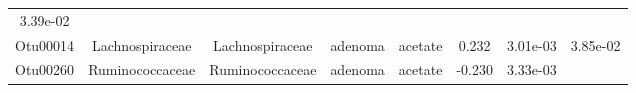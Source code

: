 \documentclass[11pt,]{article}
\begin{document}
\begin{longtable}[]{@{}cccccccc@{}}
\begin{minipage}[t]{0.08\columnwidth}
3.39e-02\strut
\end{minipage}\tabularnewline
\begin{minipage}[t]{0.08\columnwidth}\centering\strut
Otu00014\strut
\end{minipage} & \begin{minipage}[t]{0.15\columnwidth}\centering\strut
Lachnospiraceae\strut
\end{minipage} & \begin{minipage}[t]{0.15\columnwidth}\centering\strut
Lachnospiraceae\strut
\end{minipage} & \begin{minipage}[t]{0.08\columnwidth}\centering\strut
adenoma\strut
\end{minipage} & \begin{minipage}[t]{0.09\columnwidth}\centering\strut
acetate\strut
\end{minipage} & \begin{minipage}[t]{0.07\columnwidth}\centering\strut
0.232\strut
\end{minipage} & \begin{minipage}[t]{0.08\columnwidth}\centering\strut
3.01e-03\strut
\end{minipage} & \begin{minipage}[t]{0.08\columnwidth}\centering\strut
3.85e-02\strut
\end{minipage}\tabularnewline
\begin{minipage}[t]{0.08\columnwidth}\centering\strut
Otu00260\strut
\end{minipage} & \begin{minipage}[t]{0.15\columnwidth}\centering\strut
Ruminococcaceae\strut
\end{minipage} & \begin{minipage}[t]{0.15\columnwidth}\centering\strut
Ruminococcaceae\strut
\end{minipage} & \begin{minipage}[t]{0.08\columnwidth}\centering\strut
adenoma\strut
\end{minipage} & \begin{minipage}[t]{0.09\columnwidth}\centering\strut
acetate\strut
\end{minipage} & \begin{minipage}[t]{0.07\columnwidth}\centering\strut
-0.230\strut
\end{minipage} & \begin{minipage}[t]{0.08\columnwidth}\centering\strut
3.33e-03\strut
\end{minipage} & \begin{minipage}[t]{0.08\columnwidth}\centering\strut

\end{minipage}
\end{longtable}
\end{document}
